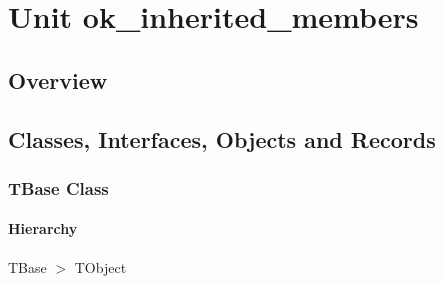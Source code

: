 \documentclass{report}
\newif\ifpdf
\begin{document}
\label{toc}\tableofcontents
\newpage
\newlength{\tmplength}
\chapter{Unit ok{\_}inherited{\_}members}
\label{ok_inherited_members}
\section{Overview}
\begin{description}
\item[\texttt{\begin{ttfamily}TBase\end{ttfamily} Class}]
\item[\texttt{\begin{ttfamily}TDerived\end{ttfamily} Class}]
\item[\texttt{\begin{ttfamily}TNewDerived\end{ttfamily} Class}]
\end{description}
\section{Classes, Interfaces, Objects and Records}
\ifpdf
\subsection*{\large{\textbf{TBase Class}}\normalsize\hspace{1ex}\hrulefill}
\else
\subsection*{TBase Class}
\fi
\label{ok_inherited_members.TBase}
\subsubsection*{\large{\textbf{Hierarchy}}\normalsize\hspace{1ex}\hfill}
TBase {$>$} TObject
\end{document}
